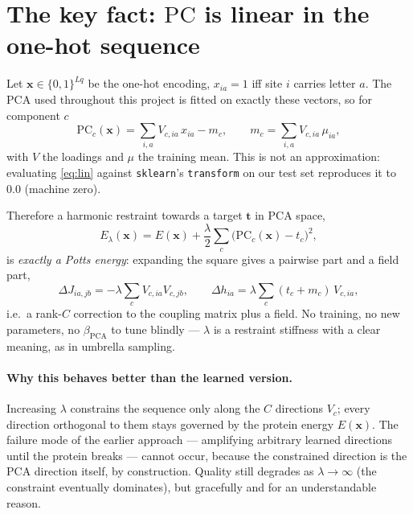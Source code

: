 \documentclass[10pt,a4paper]{article}
\newcommand{\PC}{\mathrm{PC}}
\newcommand{\PCA}{\mathrm{PCA}}
\begin{document}
\section{The key fact: $\PC$ is linear in the one-hot sequence}\label{sec:cond}
Let $\bm x\in\{0,1\}^{Lq}$ be the one-hot encoding, $x_{ia}=1$ iff site $i$ carries letter $a$.
The PCA used throughout this project is fitted on exactly these vectors, so for component $c$
\begin{equation}
\PC_c(\bm x)=\sum_{i,a}V_{c,ia}\,x_{ia}-m_c,\qquad m_c=\sum_{i,a}V_{c,ia}\,\mu_{ia},
\label{eq:lin}
\end{equation}
with $V$ the loadings and $\mu$ the training mean. This is not an approximation: evaluating
\eqref{eq:lin} against \texttt{sklearn}'s \texttt{transform} on our test set reproduces it to
$0.0$ (machine zero).

Therefore a harmonic restraint towards a target $\bm t$ in PCA space,
\begin{equation}
E_\lambda(\bm x)=E(\bm x)+\frac{\lambda}{2}\sum_{c}\big(\PC_c(\bm x)-t_c\big)^2 ,
\label{eq:restraint}
\end{equation}
is \emph{exactly a Potts energy}: expanding the square gives a pairwise part and a field part,
\begin{equation}
\Delta J_{ia,jb}=-\lambda\sum_c V_{c,ia}V_{c,jb},\qquad
\Delta h_{ia}=\lambda\sum_c (t_c+m_c)\,V_{c,ia},
\end{equation}
i.e.\ a rank-$C$ correction to the coupling matrix plus a field. No training, no new parameters,
no $\beta_{\PCA}$ to tune blindly --- $\lambda$ is a restraint stiffness with a clear meaning, as
in umbrella sampling.

\paragraph{Why this behaves better than the learned version.} Increasing $\lambda$ constrains the
sequence only along the $C$ directions $V_c$; every direction orthogonal to them stays governed by
the protein energy $E(\bm x)$. The failure mode of the earlier approach --- amplifying arbitrary
learned directions until the protein breaks --- cannot occur, because the constrained direction is
the PCA direction itself, by construction. Quality still degrades as $\lambda\to\infty$ (the
constraint eventually dominates), but gracefully and for an understandable reason.
\end{document}
